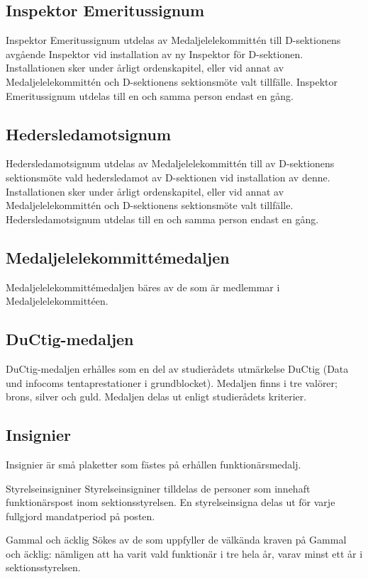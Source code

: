 \documentclass[pdfbookmarks,a4paper,11pt]{article}
\newlength{\itemcollength}
\newenvironment{reglemlista}{%
  \begin{list}{}{%
      \setlength{\labelwidth}{\itemcollength}%
      \setlength{\leftmargin}{\labelwidth + \labelsep}%
      \renewcommand{\makelabel}[1]{%
        \raisebox{0pt}[1ex][0pt]{%
          \makebox[\labelwidth][l]{%
            \parbox[t]{\itemcollength}{%
              \raggedright\hspace{0pt}##1}}}\hfill}%
      }}{%
  \end{list}}
\begin{document}
\subsection{Inspektor Emeritussignum}
Inspektor Emeritussignum utdelas av Medaljelelekommittén till D-sektionens avgående Inspektor vid installation av ny Inspektor för D-sektionen. Installationen sker under årligt ordenskapitel, eller vid annat av Medaljelelekommittén och D-sektionens sektionsmöte valt tillfälle. Inspektor Emeritussignum utdelas till en och samma person endast en gång.

\subsection{Hedersledamotsignum}
Hedersledamotsignum utdelas av Medaljelelekommittén till av D-sektionens sektionsmöte vald hedersledamot av D-sektionen vid installation av denne. Installationen sker under årligt ordenskapitel, eller vid annat av Medaljelelekommittén och D-sektionens sektionsmöte valt tillfälle. Hedersledamotsignum utdelas till en och samma person endast en gång.

\subsection{Medaljelelekommittémedaljen}
Medaljelelekommittémedaljen bäres av de som är medlemmar i Medaljelelekommittéen.

\subsection{DuCtig-medaljen}
DuCtig-medaljen erhålles som en del av studierådets utmärkelse DuCtig (Data und infocoms tentaprestationer i grundblocket). Medaljen finns i tre valörer; brons, silver och guld. Medaljen delas ut enligt studierådets kriterier.

\subsection{Insignier}
Insignier är små plaketter som fästes på erhållen funktionärsmedalj.

\begin{reglemlista}
	\item[Styrelseinsigniner]
	Styrelseinsigniner tilldelas de personer som innehaft funktionärspost inom sektionsstyrelsen. En styrelseinsigna delas ut för varje fullgjord mandatperiod på posten.
	\item[Gammal och äcklig]
	Sökes av de som uppfyller de välkända kraven på Gammal och äcklig: nämligen att ha varit vald funktionär i tre hela år, varav minst ett år i sektionsstyrelsen.
\end{reglemlista}
\end{document}
